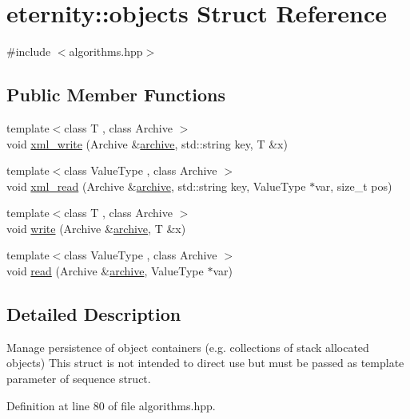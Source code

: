 \hypertarget{structeternity_1_1objects}{}\section{eternity\+:\+:objects Struct Reference}
\label{structeternity_1_1objects}


{\ttfamily \#include $<$algorithms.\+hpp$>$}

\subsection*{Public Member Functions}
\begin{DoxyCompactItemize}
\item 
{\footnotesize template$<$class T , class Archive $>$ }\\void \hyperlink{structeternity_1_1objects_a1c4f6adbfec429e299ed9b87d3e882dc}{xml\+\_\+write} (Archive \&\hyperlink{classeternity_1_1archive}{archive}, std\+::string key, T \&x)
\item 
{\footnotesize template$<$class Value\+Type , class Archive $>$ }\\void \hyperlink{structeternity_1_1objects_a784de99cba7a1d4a1a048fa6a4ac5a4f}{xml\+\_\+read} (Archive \&\hyperlink{classeternity_1_1archive}{archive}, std\+::string key, Value\+Type $\ast$var, size\+\_\+t pos)
\item 
{\footnotesize template$<$class T , class Archive $>$ }\\void \hyperlink{structeternity_1_1objects_a4a22aa281cdd22163b1a4f52065185e6}{write} (Archive \&\hyperlink{classeternity_1_1archive}{archive}, T \&x)
\item 
{\footnotesize template$<$class Value\+Type , class Archive $>$ }\\void \hyperlink{structeternity_1_1objects_a7454fa173d59bfe23b5ac6fa78cbdfc9}{read} (Archive \&\hyperlink{classeternity_1_1archive}{archive}, Value\+Type $\ast$var)
\end{DoxyCompactItemize}


\subsection{Detailed Description}
Manage persistence of object containers (e.\+g. collections of stack allocated objects) This struct is not intended to direct use but must be passed as template parameter of sequence struct. 

Definition at line 80 of file algorithms.\+hpp.



